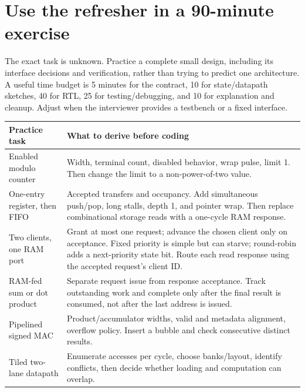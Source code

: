 \documentclass[11pt]{article}
\begin{document}
\section{Use the refresher in a 90-minute exercise}\label{sec:practice}
The exact task is unknown. Practice a complete small design, including its interface decisions and verification, rather than trying to predict one architecture.
A useful time budget is 5 minutes for the contract, 10 for state/datapath sketches, 40 for RTL, 25 for testing/debugging, and 10 for explanation and cleanup.
Adjust when the interviewer provides a testbench or a fixed interface.

\begin{longtable}{@{}L{4.2cm}L{11.8cm}@{}}
\toprule Practice task & What to derive before coding \\ \midrule\endhead
Enabled modulo counter & Width, terminal count, disabled behavior, wrap pulse, limit 1. Then change the limit to a non-power-of-two value.\\
One-entry register, then FIFO & Accepted transfers and occupancy. Add simultaneous push/pop, long stalls, depth 1, and pointer wrap. Then replace combinational storage reads with a one-cycle RAM response.\\
Two clients, one RAM port & Grant at most one request; advance the chosen client only on acceptance. Fixed priority is simple but can starve; round-robin adds a next-priority state bit. Route each read response using the accepted request's client ID.\\
RAM-fed sum or dot product & Separate request issue from response acceptance. Track outstanding work and complete only after the final result is consumed, not after the last address is issued.\\
Pipelined signed MAC & Product/accumulator widths, valid and metadata alignment, overflow policy. Insert a bubble and check consecutive distinct results.\\
Tiled two-lane datapath & Enumerate accesses per cycle, choose banks/layout, identify conflicts, then decide whether loading and computation can overlap.\\
\bottomrule
\end{longtable}
\end{document}
